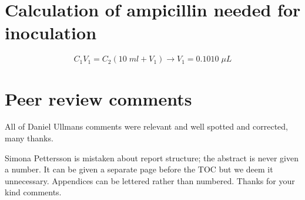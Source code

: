 \documentclass[11pt,a4paper]{article}
\begin{document}
\section{Calculation of ampicillin needed for inoculation} 
$$
     C_1V_1=C_2(10 \;ml+V_1) \rightarrow V_1=0.1010\; \mu L 
     \label{ampicillin}
    $$
 
 \section{Peer review comments}
 All of Daniel Ullmans comments were relevant and well spotted and corrected, many thanks.
 
 Simona Pettersson is mistaken about report structure; the abstract is never given a number. It can be given a separate page before the TOC but we deem it unnecessary. Appendices can be lettered rather than numbered. Thanks for your kind comments.
\end{document}
